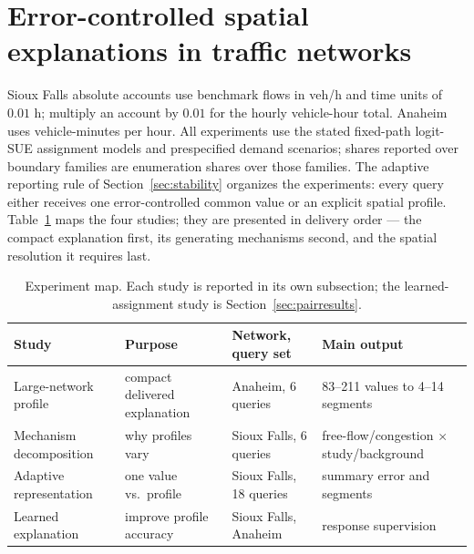 \section{Error-controlled spatial explanations in traffic networks}\label{sec:numerics}
Sioux Falls absolute accounts use benchmark flows in veh/h and time units of $0.01$ h; multiply an account by $0.01$ for the hourly vehicle-hour total. Anaheim uses vehicle-minutes per hour. All experiments use the stated fixed-path logit-SUE assignment models and prespecified demand scenarios; shares reported over boundary families are enumeration shares over those families. The adaptive reporting rule of Section~\ref{sec:stability} organizes the experiments: every query either receives one error-controlled common value or an explicit spatial profile. Table~\ref{tab:experimentmap} maps the four studies; they are presented in delivery order --- the compact explanation first, its generating mechanisms second, and the spatial resolution it requires last.
\begin{table}[pos=tb]
\footnotesize
\caption{Experiment map. Each study is reported in its own subsection; the learned-assignment study is Section~\ref{sec:pairresults}.}\label{tab:experimentmap}
\begin{tabular*}{\tblwidth}{@{\extracolsep{\fill}}llll@{}}
\toprule Study & Purpose & Network, query set & Main output\\
\midrule
Large-network profile & compact delivered explanation & Anaheim, 6 queries & 83--211 values to 4--14 segments\\
Mechanism decomposition & why profiles vary & Sioux Falls, 6 queries & free-flow/congestion $\times$ study/background\\
Adaptive representation & one value vs.\ profile & Sioux Falls, 18 queries & summary error and segments\\
Learned explanation & improve profile accuracy & Sioux Falls, Anaheim & response supervision\\
\bottomrule\end{tabular*}\end{table}
